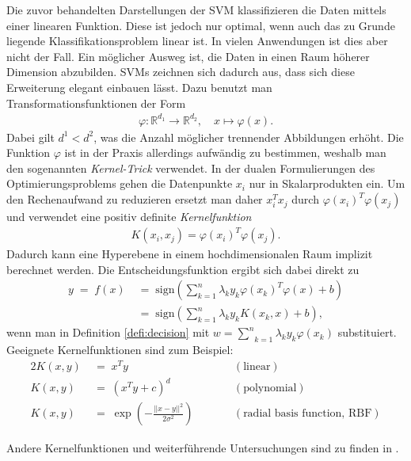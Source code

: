 Die zuvor behandelten Darstellungen der SVM klassifizieren die Daten mittels einer linearen Funktion. Diese ist jedoch nur optimal, wenn auch das zu Grunde liegende Klassifikationsproblem linear ist. In vielen Anwendungen ist dies aber nicht der Fall. Ein möglicher Ausweg ist, die Daten in einen Raum höherer Dimension abzubilden. SVMs zeichnen sich dadurch aus, dass sich diese Erweiterung elegant einbauen lässt. Dazu benutzt man Transformationsfunktionen der Form
\begin{align*}
	\varphi \colon \mathbb {R} ^{d_{1}}\rightarrow \mathbb {R} ^{d_{2}},\quad x \mapsto \varphi (x).
\end{align*}
Dabei gilt \(d^1<d^2\), was die Anzahl möglicher trennender Abbildungen erhöht. Die Funktion \(\varphi\) ist in der Praxis allerdings aufwändig zu bestimmen, weshalb man den sogenannten \textit{Kernel-Trick} verwendet. In der dualen Formulierungen des Optimierungsproblems gehen die Datenpunkte \(x_i\) nur in Skalarprodukten ein. Um den Rechenaufwand zu reduzieren ersetzt man daher \(x_i^Tx_j\) durch \(\varphi(x_i)^T\varphi(x_j)\) und verwendet eine positiv definite \textit{Kernelfunktion}
\begin{align*}
	K(x_{i},x_{j})=\varphi (x_{i})^T\varphi (x_{j}).
\end{align*}
Dadurch kann eine Hyperebene in einem hochdimensionalen Raum implizit berechnet werden. Die Entscheidungsfunktion ergibt sich dabei direkt zu
\begin{align*}
	y\;=\;f(x)&\;=\;\text{sign}\left(\sum_{k=1}^{n}\lambda_ky_k\varphi(x_k)^T\varphi(x)+b\right)\\
	&\;=\;\text{sign}\left(\sum_{k=1}^{n}\lambda_ky_kK\left(x_k,x\right)+b\right),
\end{align*}
wenn man in Definition \autoref{defi:decision} mit \(w=\underset{k=1}{\overset{n}{\sum}}\lambda_ky_k\varphi(x_k)\) substituiert.\\[0,3cm]

Geeignete Kernelfunktionen sind zum Beispiel:
\begin{alignat*}{2}
	K(x,y)&\;=\;x^Ty && (\text{linear})\\
	K(x,y)&\;=\;\left(x^Ty+c\right)^d && (\text{polynomial})\\
	K(x,y)&\;=\;\exp \left(-{\tfrac {||x-y||^{{2}}}{2\sigma ^{{2}}}}\right) \qquad&& (\text{radial basis function, RBF})
\end{alignat*}

Andere Kernelfunktionen und weiterführende Untersuchungen sind zu finden in \cite{Kernel}.

